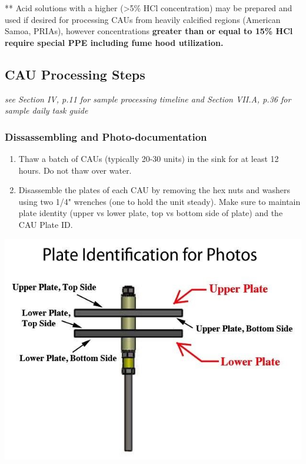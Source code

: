 \documentclass[
]{book}
\begin{document}
** Acid solutions with a higher (\textgreater5\% HCl concentration) may be prepared and used if desired for processing CAUs from heavily calcified regions (American Samoa, PRIAs), however concentrations \textbf{greater than or equal to 15\% HCl require special PPE including fume hood utilization.}

\hypertarget{cau-processing-steps}{%
\subsection{CAU Processing Steps}\label{cau-processing-steps}}

\emph{see Section IV, p.11 for sample processing timeline and Section VII.A, p.36 for sample daily task guide}

\hypertarget{dissassembling-and-photo-documentation}{%
\subsubsection{Dissassembling and Photo-documentation}\label{dissassembling-and-photo-documentation}}

\begin{enumerate}
\def\labelenumi{\arabic{enumi}.}
\item
  Thaw a batch of CAUs (typically 20-30 units) in the sink for at least 12 hours. Do not thaw over water.
\item
  Disassemble the plates of each CAU by removing the hex nuts and washers using two 1/4" wrenches (one to hold the unit steady). Make sure to maintain plate identity (upper vs lower plate, top vs bottom side of plate) and the CAU Plate ID.
\end{enumerate}

\includegraphics{images/CAU_plate_ID.jpg}
\end{document}
